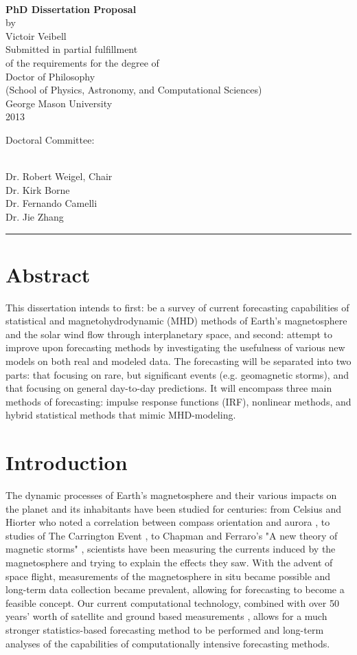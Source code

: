 \documentclass[10pt]{article}
\def\titlepage#1#2#3#4#5#6{
 \begin{singlespace}
 \hbox{ }
 \begin{center}

  {\Large\bf #1 \mbox{}} \\

  \vfill
  by \\
  \vspace{2ex} %
  #2 \\
  \vfill
   Submitted in partial fulfillment \\
   of the requirements for the degree of \\
   #3 \\
   (#4) \\
   George Mason University \\
   #5 \\
 \end{center}
 \vfill
  Doctoral Committee: \\[2ex]
  \mbox{ }\hspace{0.6in}
  \parbox{5.3in}{#6}
 \end{singlespace}
}
\begin{document}
\titlepage{PhD Dissertation Proposal}{Victoir Veibell}{Doctor of Philosophy}{School of Physics, Astronomy, and Computational Sciences}{2013}
{Dr. Robert Weigel, Chair\\ 
Dr. Kirk Borne\\
Dr. Fernando Camelli\\
Dr. Jie Zhang\\
}

\hrule
\setlength{\parskip}{3ex}
\renewcommand{\labelitemi}{$-$}

\newpage
\section{Abstract}

This dissertation intends to first: be a survey of current forecasting capabilities of statistical and  magnetohydrodynamic (MHD) methods of Earth's magnetosphere and the solar wind flow through interplanetary space, and second: attempt to improve upon forecasting methods by investigating the usefulness of various new models on both real and modeled data. The forecasting will be separated into two parts: that focusing on rare, but significant events (e.g. geomagnetic storms), and that focusing on general day-to-day predictions. It will encompass three main methods of forecasting: impulse response functions (IRF), nonlinear methods, and hybrid statistical methods that mimic MHD-modeling.

\section{Introduction}

The dynamic processes of Earth's magnetosphere and their various impacts on the planet and its inhabitants have been studied for centuries: from Celsius and Hiorter who noted a correlation between compass orientation and aurora \citep{Maunder} , to studies of The Carrington Event \citep{Carrington}, to Chapman and Ferraro's "A new theory of magnetic storms" \citep{Chapman}, scientists have been measuring the currents induced by the magnetosphere and trying to explain the effects they saw. With the advent of space flight, measurements of the magnetosphere in situ became possible and long-term data collection became prevalent, allowing for forecasting to become a feasible concept. Our current computational technology, combined with over 50 years' worth of satellite and ground based measurements \citep{HistMagnetometer}, allows for a much stronger statistics-based forecasting method to be performed and long-term analyses of the capabilities of computationally intensive forecasting methods.
\end{document}
